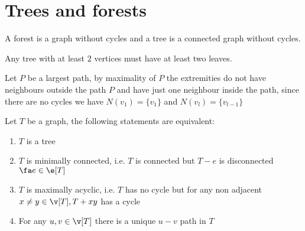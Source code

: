 \section{Trees and forests}
A forest is a graph without cycles and a tree is a connected graph without cycles.
\begin{lemma}
    \label{lemma:1.14}
    Any tree with at least $2$ vertices must have at least two leaves.
\end{lemma}
\begin{prf}
    Let $P$ be a largest path, by maximality of $P$ the extremities do not have neighbours outside the path $P$ and have just one neighbour inside the path, since there are no cycles we have $N(v_1) = \{v_1\}$ and $N(v_l) = \{v_{l - 1}\}$
\end{prf}
\begin{theorem}
    \label{theorem:1.15}
    Let $T$ be a graph, the following statements are equivalent:
    \begin{enumerate}
        \item $T$ is a tree
        \item $T$ is minimally connected, i.e. $T$ is connected but $T - e$ is disconnected $\fa e \in \e[T]$
        \item $T$ is maximally acyclic, i.e. $T$ has no cycle but for any non adjacent $x \neq y \in \v[T], T + xy$ has a cycle
        \item For any $u, v \in \v[T]$ there is a unique $u - v$ path in $T$
    \end{enumerate}
\end{theorem}
